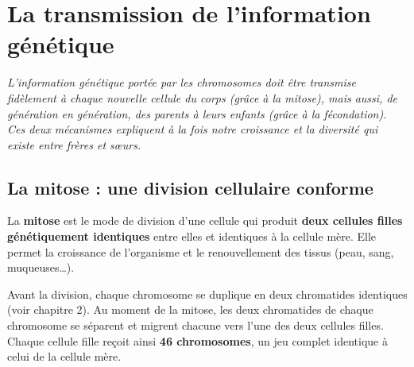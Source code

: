 \chapter{La transmission de l'information génétique}

\noindent\textit{L'information génétique portée par les chromosomes doit être transmise
fidèlement à chaque nouvelle cellule du corps (grâce à la mitose), mais aussi, de
génération en génération, des parents à leurs enfants (grâce à la fécondation). Ces
deux mécanismes expliquent à la fois notre croissance et la diversité qui existe entre
frères et sœurs.}
\vspace{8pt}

\connecteBanner

\section{La mitose : une division cellulaire conforme}

\begin{definition}[Mitose]
La \textbf{mitose} est le mode de division d'une cellule qui produit \textbf{deux
cellules filles génétiquement identiques} entre elles et identiques à la cellule mère.
Elle permet la croissance de l'organisme et le renouvellement des tissus (peau, sang,
muqueuses\dots).
\end{definition}

\begin{propriete}[Déroulement]
Avant la division, chaque chromosome se duplique en deux chromatides identiques (voir
chapitre 2). Au moment de la mitose, les deux chromatides de chaque chromosome se
séparent et migrent chacune vers l'une des deux cellules filles. Chaque cellule fille
reçoit ainsi \textbf{46 chromosomes}, un jeu complet identique à celui de la cellule
mère.
\end{propriete}

\begin{illus}
\end{illus}


